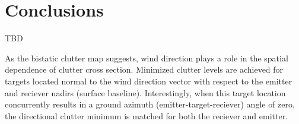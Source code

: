 \renewcommand{\baselinestretch}{2} \small\normalsize
\section{Conclusions}

TBD

As the bistatic clutter map suggests, wind direction plays a role in the spatial dependence of clutter cross section. Minimized clutter levels are achieved for targets located normal to the wind direction vector with respect to the emitter and reciever nadirs (surface baseline). Interestingly, when this target location concurrently results in a ground azimuth (emitter-target-reciever) angle of zero, the directional clutter minimum is matched for both the reciever and emitter.